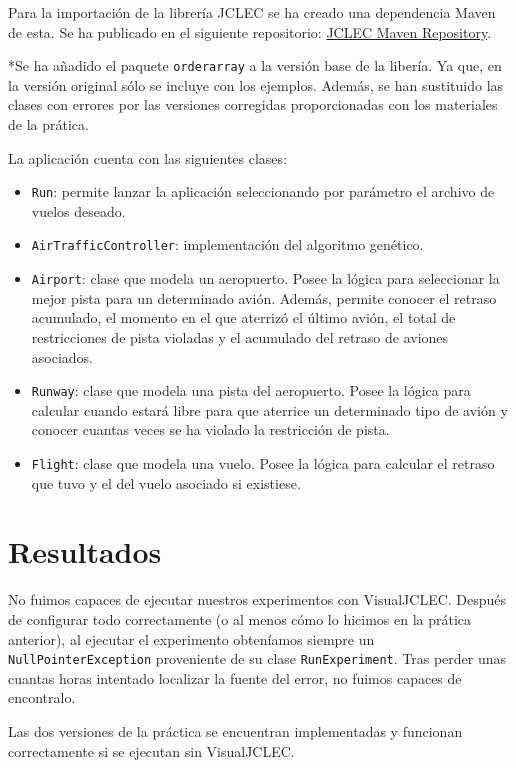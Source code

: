 \documentclass[a4paper,12pt,titlepage]{article}
\begin{document}
Para la importación de la librería JCLEC se ha creado una dependencia Maven de esta. Se ha publicado en el siguiente repositorio: \href{https://github.com/davidmigloz/jclec\_maven\_repo}{JCLEC Maven Repository}. 

*Se ha añadido el paquete \lstinline|orderarray| a la versión base de la libería. Ya que, en la versión original sólo se incluye con los ejemplos. Además, se han sustituido las clases con errores por las versiones corregidas proporcionadas con los materiales de la prática.

La aplicación cuenta con las siguientes clases:

\begin{itemize}[noitemsep]
	\item \lstinline|Run|: permite lanzar la aplicación seleccionando por parámetro el archivo de vuelos deseado.
	\item \lstinline|AirTrafficController|: implementación del algoritmo genético.
	\item \lstinline|Airport|: clase que modela un aeropuerto. Posee la lógica para seleccionar la mejor pista para un determinado avión. Además, permite conocer el retraso acumulado, el momento en el que aterrizó el último avión, el total de restricciones de pista violadas y el acumulado del retraso de aviones asociados.
	\item \lstinline|Runway|: clase que modela una pista del aeropuerto. Posee la lógica para calcular cuando estará libre para que aterrice un determinado tipo de avión y conocer cuantas veces se ha violado la restricción de pista.
	\item \lstinline|Flight|: clase que modela una vuelo. Posee la lógica para calcular el retraso que tuvo y el del vuelo asociado si existiese.
\end{itemize}


\section{Resultados}

No fuimos capaces de ejecutar nuestros experimentos con VisualJCLEC. Después de configurar todo correctamente (o al menos cómo lo hicimos en la prática anterior), al ejecutar el experimento obteníamos siempre un \lstinline|NullPointerException| proveniente de su clase \lstinline|RunExperiment|. Tras perder unas cuantas horas intentado localizar la fuente del error, no fuimos capaces de encontralo.

Las dos versiones de la práctica se encuentran implementadas y funcionan correctamente si se ejecutan sin VisualJCLEC. 
\end{document}
